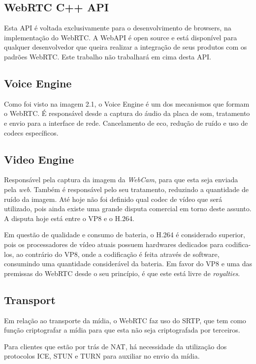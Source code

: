 \documentclass[ruledheader]{abnt} %
\begin{document}
\subsection{WebRTC C++ API}
\label{ss_webrtcAPI}
Esta API é voltada exclusivamente para o desenvolvimento de browsers, na implementação do WebRTC. A WebAPI é open source e está disponível para qualquer desenvolvedor que queira realizar a integração de seus produtos com os padrões WebRTC. Este trabalho não trabalhará em cima desta API.

\subsection{Voice Engine}
\label{ss_voiceEngine}
Como foi visto na imagem 2.1, o Voice Engine é um dos mecanismos que formam o WebRTC. É responsável desde a captura do áudio da placa de som, tratamento e envio para a interface de rede. Cancelamento de eco, redução de ruído e uso de codecs específicos.

\subsection{Video Engine}
\label{ss_videoEngine}
Responsável pela captura da imagem da \textit{WebCam}, para que esta seja enviada pela \textit{web}. Também é responsável pelo seu tratamento, reduzindo a quantidade de ruído da imagem.
Até hoje não foi definido qual codec de vídeo que será utilizado, pois ainda existe uma grande disputa comercial em torno deste assunto. A disputa hoje está entre o VP8 e o H.264. 

Em questão de qualidade e consumo de bateria, o H.264 é considerado superior, pois os processadores de vídeo atuais possuem hardwares dedicados para codifica-los, ao contrário do VP8, onde a codificação é feita através de software, consumindo uma quantidade considerável da bateria. Em favor do VP8 e uma das premissas do WebRTC desde o seu princípio, é que este está livre de \textit{royalties}\cite{Borges:2013}.

\subsection{Transport}
\label{ss_videoEngine}
Em relação ao transporte da mídia, o WebRTC faz uso do SRTP, que tem como função criptografar a mídia para que esta não seja criptografada por terceiros.

Para clientes que estão por trás de NAT, há necessidade da utilização dos protocolos ICE, STUN e TURN para auxiliar no envio da mídia. 
\end{document}
